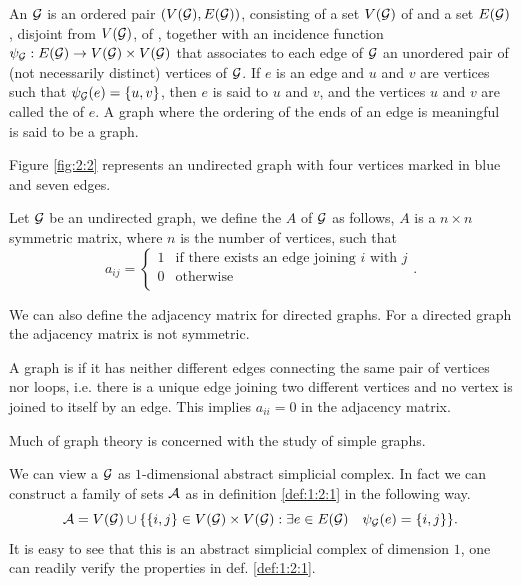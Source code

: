 \documentclass[../2.tex]{subfiles}
\begin{document}
    \begin{defn}
        An  $\mathcal{G}$ is an ordered pair $(V(\mathcal{G}),E(\mathcal{G}))$, consisting of a set $V(\mathcal{G})$ of 
        and a set $E(\mathcal{G})$, disjoint from $V(\mathcal{G})$, of , together with an incidence function
        $\psi_{\mathcal{G}}:E(\mathcal{G}) \to V(\mathcal{G}) \times V(\mathcal{G})$ that associates to each edge of $\mathcal{G}$ an unordered pair of (not necessarily
        distinct) vertices of $\mathcal{G}$. If $e$ is an edge and $u$ and $v$ are vertices such that $\psi_{\mathcal{G}}(e) =
        \{u, v\}$, then $e$ is said to  $u$ and $v$, and the vertices $u$ and $v$ are called the 
        of $e$. A graph where the ordering of the ends of an edge is meaningful is said to be a  graph.
    \end{defn}

    Figure \ref{fig:2:2} represents an undirected graph with four vertices marked in blue and seven edges.

    \begin{defn}
        Let $\mathcal{G}$ be an undirected graph, we define the  $A$ of $\mathcal{G}$ as follows,
        $A$ is a $n \times n$ symmetric matrix, where $n$ is the number of vertices, such that
        \[a_{ij} = 
        \begin{cases}
            1 & \text{if there exists an edge joining $i$ with $j$} \\
            0 & \text{otherwise} \\
        \end{cases}. \]        
    \end{defn}

    \begin{rem}
        We can also define the adjacency matrix for directed graphs.
        For a directed graph the adjacency matrix is not symmetric.
    \end{rem}

    \begin{defn}
        A graph is  if it has neither different edges connecting the same pair of vertices nor loops, i.e. there is a unique edge joining two different vertices
        and no vertex is joined to itself by an edge. This implies $a_{ii} = 0$ in the adjacency matrix.
    \end{defn}
    
    Much of graph theory is concerned with the study of simple graphs.

    \begin{obs}
        We can view a  $\mathcal{G}$ as $1$-dimensional abstract simplicial complex.
        In fact we can construct a family of sets $\mathcal{A}$ as in definition \ref{def:1:2:1} in the following way.
        \[ \mathcal{A} = V(\mathcal{G}) \cup \{ \{i,j\} \in V(\mathcal{G}) \times V(\mathcal{G}) : \exists e \in E(\mathcal{G}) \quad \psi_{\mathcal{G}}(e)=\{i,j\}\}. \]
        It is easy to see that this is an abstract simplicial complex of dimension $1$, one can readily verify the properties in def. \ref{def:1:2:1}.
    \end{obs}
\end{document}
